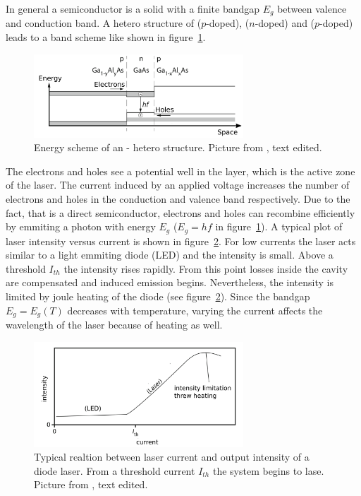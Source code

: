 In general a semiconductor is a solid with a finite bandgap $E_g$ between valence and conduction band. A hetero structure of  ($p$-doped),
 ($n$-doped)
and  ($p$-doped) leads to a band scheme like shown in figure~\ref{fig: bandstructure}. 
\begin{figure}
  \centering
  \includegraphics[width = 0.7\textwidth]{pics/hetero_structure.pdf}
  \caption{Energy scheme of an - hetero structure. Picture from \cite{eichler}, text edited.}
  \label{fig: bandstructure}
\end{figure}
The electrons and holes see a potential well
in the  layer, which is the active zone of the laser. The current induced by an applied voltage increases the number of electrons
and holes in the conduction and valence band respectively. Due to the fact, that  is a direct semiconductor, electrons and holes can
recombine efficiently by emmiting a photon with energy $E_g$ ($E_g = hf$ in figure~\ref{fig: bandstructure}). A typical plot of laser intensity versus current is shown in figure~\ref{fig: threshold}. For low
currents the laser acts similar to a light emmiting diode (LED) and the intensity is small. Above a threshold $I_{th}$ the intensity rises rapidly.
From this point losses inside the cavity are compensated and induced emission begins. Nevertheless, the intensity is limited by joule heating
of the diode (see figure~\ref{fig: threshold}). Since the bandgap $E_g = E_g(T)$ decreases with temperature, varying the current affects
the wavelength of the laser because of heating as well.



\begin{figure}
  \centering
  \includegraphics[width = 0.7\textwidth]{pics/threshold.png}
  \caption{Typical realtion between laser current and output intensity of a diode laser. From a threshold current 
  $I_{th}$ the system begins to lase. Picture from \cite{eichler}, text edited.}
  \label{fig: threshold}
\end{figure}

